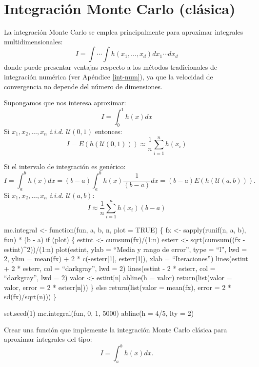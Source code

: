 \documentclass[
]{book}
\theoremstyle{break}
\theoremstyle{definition}
\theoremstyle{definition}
\theoremstyle{definition}
\theoremstyle{remark}
\let\BeginKnitrBlock\begin \let\EndKnitrBlock\end
\begin{document}
\hypertarget{integraciuxf3n-monte-carlo-cluxe1sica}{%
\section{Integración Monte Carlo (clásica)}\label{integraciuxf3n-monte-carlo-cluxe1sica}}

La integración Monte Carlo se emplea principalmente para aproximar integrales multidimensionales:
\[I = \int \cdots \int h\left( x_1,\ldots ,x_d\right) dx_1 \cdots dx_d\]
donde puede presentar ventajas respecto a los métodos tradicionales de integración numérica (ver Apéndice \ref{int-num}),
ya que la velocidad de convergencia no depende del número de dimensiones.

Supongamos que nos interesa aproximar:
\[I = \int_0^1h\left( x\right) dx\]
Si \(x_1,x_2,\ldots ,x_n\) \emph{i.i.d.} \(\mathcal{U}\left( 0,1\right)\)
entonces:
\[I = E\left( h\left( \mathcal{U}\left( 0,1\right) \right) \right)
\approx \frac{1}{n}\sum\limits_{i=1}^nh\left( x_i\right)\]

Si el intervalo de integración es
genérico:
\[I = \int_a^bh\left( x\right) dx = 
(b-a)\int_a^bh\left( x\right) \frac1{(b-a)}dx = 
(b-a)E\left( h\left( \mathcal{U}\left( a, b \right) \right) \right).\]
Si \(x_1,x_2,\ldots ,x_n\) \emph{i.i.d.}
\(\mathcal{U}\left( a, b\right)\):
\[I\approx \frac{1}{n}\sum\limits_{i=1}^nh\left( x_i\right) (b-a)\]

\BeginKnitrBlock{exercise}
\protect\hypertarget{exr:mc-integral}{}{\label{exr:mc-integral} } mc.integral \textless- function(fun, a, b, n, plot = TRUE) \{
fx \textless- sapply(runif(n, a, b), fun) * (b - a)
if (plot) \{
estint \textless- cumsum(fx)/(1:n)
esterr \textless- sqrt(cumsum((fx - estint)\^{}2))/(1:n)
plot(estint, ylab = ``Media y rango de error'', type = ``l'', lwd = 2, ylim = mean(fx) +
2 * c(-esterr{[}1{]}, esterr{[}1{]}), xlab = ``Iteraciones'')
lines(estint + 2 * esterr, col = ``darkgray'', lwd = 2)
lines(estint - 2 * esterr, col = ``darkgray'', lwd = 2)
valor \textless- estint{[}n{]}
abline(h = valor)
return(list(valor = valor, error = 2 * esterr{[}n{]}))
\} else return(list(valor = mean(fx), error = 2 * sd(fx)/sqrt(n)))
\}

set.seed(1)
mc.integral(fun, 0, 1, 5000)
abline(h = 4/5, lty = 2)
\EndKnitrBlock{exercise}

Crear una función que implemente la integración Monte Carlo clásica
para aproximar integrales del tipo:
\[I = \int_a^b h(x)  dx.\]
\end{document}
